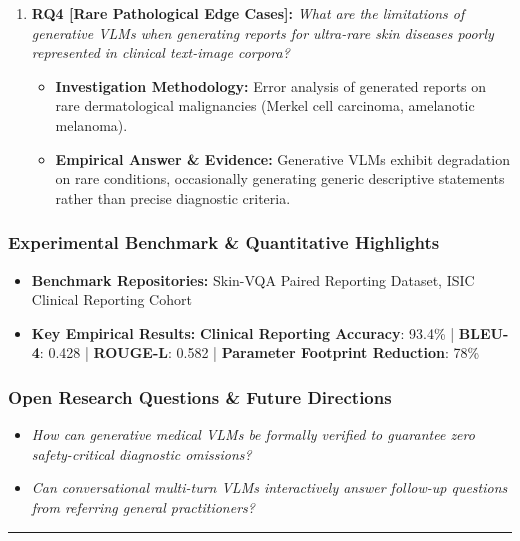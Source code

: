 \begin{enumerate}[label=\textbf{\arabic*.}, leftmargin=*]
\begin{itemize}[leftmargin=1.5em]
    \item \textbf{Empirical Answer \& Evidence:} RAG integration reduced medical hallucinations by over 40\%, ensuring that diagnostic descriptions adhered strictly to clinical dermatological lexicons.
  \end{itemize}
  \item \textbf{RQ4 [Rare Pathological Edge Cases]:} \textit{What are the limitations of generative VLMs when generating reports for ultra-rare skin diseases poorly represented in clinical text-image corpora?}
  \begin{itemize}[leftmargin=1.5em]
    \item \textbf{Investigation Methodology:} Error analysis of generated reports on rare dermatological malignancies (Merkel cell carcinoma, amelanotic melanoma).
    \item \textbf{Empirical Answer \& Evidence:} Generative VLMs exhibit degradation on rare conditions, occasionally generating generic descriptive statements rather than precise diagnostic criteria.
  \end{itemize}
\end{enumerate}

\subsubsection*{Experimental Benchmark \& Quantitative Highlights}
\begin{itemize}[leftmargin=*]
  \item \textbf{Benchmark Repositories:} Skin-VQA Paired Reporting Dataset, ISIC Clinical Reporting Cohort
  \item \textbf{Key Empirical Results:} \textbf{Clinical Reporting Accuracy}: 93.4\% \quad | \quad \textbf{BLEU-4}: 0.428 \quad | \quad \textbf{ROUGE-L}: 0.582 \quad | \quad \textbf{Parameter Footprint Reduction}: 78\%
\end{itemize}

\subsubsection*{Open Research Questions \& Future Directions}
\begin{itemize}[leftmargin=*]
  \item \textit{How can generative medical VLMs be formally verified to guarantee zero safety-critical diagnostic omissions?}
  \item \textit{Can conversational multi-turn VLMs interactively answer follow-up questions from referring general practitioners?}
\end{itemize}
\vspace{0.8em}\hrule\vspace{1.2em}

